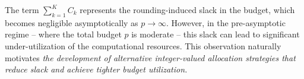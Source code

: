 %
The term $\sum_{k=1}^K C_k$ represents the rounding-induced slack in the budget, which becomes negligible asymptotically as $p \to \infty$. However, in the pre-asymptotic regime -- where the total budget $p$ is moderate -- this  slack can lead to significant under-utilization of the computational resources. This observation naturally motivates \textit{the development of  alternative integer-valued allocation strategies that reduce slack and achieve tighter budget utilization.}





















